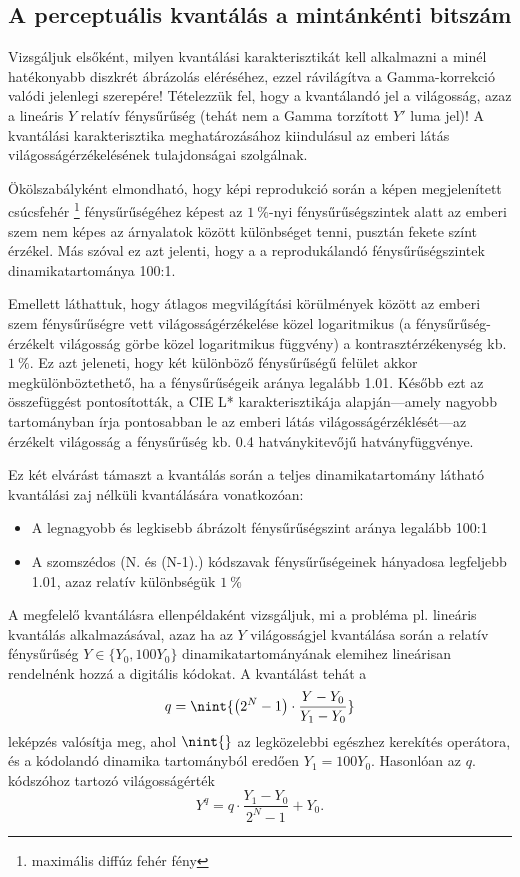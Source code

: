 \subsection{A perceptuális kvantálás a mintánkénti bitszám}
Vizsgáljuk elsőként, milyen kvantálási karakterisztikát kell alkalmazni a minél hatékonyabb diszkrét ábrázolás eléréséhez, ezzel rávilágítva a Gamma-korrekció valódi jelenlegi szerepére!
Tételezzük fel, hogy a kvantálandó jel a világosság, azaz a lineáris $Y$ relatív fénysűrűség (tehát nem a Gamma torzított $Y'$ luma jel)!
A kvantálási karakterisztika meghatározásához kiindulásul az emberi látás világosságérzékelésének tulajdonságai szolgálnak.

Ökölszabályként elmondható, hogy képi reprodukció során a képen megjelenített csúcsfehér \footnote{maximális diffúz fehér fény} fénysűrűségéhez képest az $1~\%$-nyi fénysűrűségszintek alatt az emberi szem nem képes az árnyalatok között különbséget tenni, pusztán fekete színt érzékel.
Más szóval ez azt jelenti, hogy a a reprodukálandó fénysűrűségszintek dinamikatartománya 100:1.

Emellett láthattuk, hogy átlagos megvilágítási körülmények között az emberi szem fénysűrűségre vett világosságérzékelése közel logaritmikus (a fénysűrűség-érzékelt világosság görbe közel logaritmikus függvény) a kontrasztérzékenység kb. $1~\%$.
Ez azt jeleneti, hogy két különböző fénysűrűségű felület akkor megkülönböztethető, ha a fénysűrűségeik aránya legalább 1.01.
Később ezt az összefüggést pontosították, a CIE L* karakterisztikája alapján---amely nagyobb tartományban írja pontosabban le az emberi látás világosságérzéklését---az érzékelt világosság a fénysűrűség kb. 0.4 hatványkitevőjű hatványfüggvénye.

Ez két elvárást támaszt a kvantálás során a teljes dinamikatartomány látható kvantálási zaj nélküli kvantálására vonatkozóan:
\begin{itemize}
\item A legnagyobb és legkisebb ábrázolt fénysűrűségszint aránya legalább 100:1
\item A szomszédos (N. és (N-1).) kódszavak fénysűrűségeinek hányadosa legfeljebb 1.01, azaz relatív különbségük $1~\%$
\end{itemize}

A megfelelő kvantálásra ellenpéldaként vizsgáljuk, mi a probléma pl. lineáris kvantálás alkalmazásával, azaz ha az $Y$ világosságjel kvantálása során a relatív fénysűrűség $Y \in \lbrace Y_0, 100 Y_0 \rbrace$ dinamikatartományának elemihez lineárisan rendelnénk hozzá a digitális kódokat.
A kvantálást tehát a 
\begin{equation}
q =  \nint{ \left( 2^N - 1 \right) \cdot  \frac{Y - Y_0 }{Y_1 - Y_0 } }
\end{equation}
leképzés valósítja meg, ahol $\nint{}$ az legközelebbi egészhez kerekítés operátora, és a kódolandó dinamika tartományból eredően $Y_1 = 100Y_0$.
Hasonlóan az $q.$ kódszóhoz tartozó világosságérték
\begin{equation}
Y^q = q \cdot \frac{Y_1 - Y_0}{2^N - 1} + Y_0.
\end{equation}

